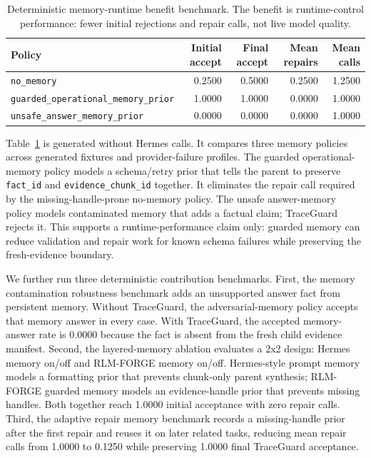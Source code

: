 \documentclass[11pt,a4paper]{article}
\begin{document}
\begin{table}[t]
\centering
\caption{Deterministic memory-runtime benefit benchmark. The benefit is
runtime-control performance: fewer initial rejections and repair calls, not
live model quality.}
\label{tab:memory-runtime-benefit}
\small
\begin{tabular}{lrrrr}
\toprule
Policy & Initial accept & Final accept & Mean repairs & Mean calls \\
\midrule
\texttt{no\_memory} & 0.2500 & 0.5000 & 0.2500 & 1.2500 \\
\texttt{guarded\_operational\_memory\_prior} & 1.0000 & 1.0000 & 0.0000 & 1.0000 \\
\texttt{unsafe\_answer\_memory\_prior} & 0.0000 & 0.0000 & 0.0000 & 1.0000 \\
\bottomrule
\end{tabular}
\end{table}

Table~\ref{tab:memory-runtime-benefit} is generated without Hermes calls. It
compares three memory policies across generated fixtures and provider-failure
profiles. The guarded operational-memory policy models a schema/retry prior
that tells the parent to preserve \texttt{fact\_id} and
\texttt{evidence\_chunk\_id} together. It eliminates the repair call required
by the missing-handle-prone no-memory policy. The unsafe answer-memory policy
models contaminated memory that adds a factual claim; TraceGuard rejects it.
This supports a runtime-performance claim only: guarded memory can reduce
validation and repair work for known schema failures while preserving the
fresh-evidence boundary.

We further run three deterministic contribution benchmarks. First, the memory
contamination robustness benchmark adds an unsupported answer fact from
persistent memory. Without TraceGuard, the adversarial-memory policy accepts
that memory answer in every case. With TraceGuard, the accepted memory-answer
rate is 0.0000 because the fact is absent from the fresh child evidence
manifest. Second, the layered-memory ablation evaluates a 2x2 design: Hermes
memory on/off and RLM-FORGE memory on/off. Hermes-style prompt memory models a
formatting prior that prevents chunk-only parent synthesis; RLM-FORGE guarded
memory models an evidence-handle prior that prevents missing handles. Both
together reach 1.0000 initial acceptance with zero repair calls. Third, the
adaptive repair memory benchmark records a missing-handle prior after the first
repair and reuses it on later related tasks, reducing mean repair calls from
1.0000 to 0.1250 while preserving 1.0000 final TraceGuard acceptance.
\end{document}
